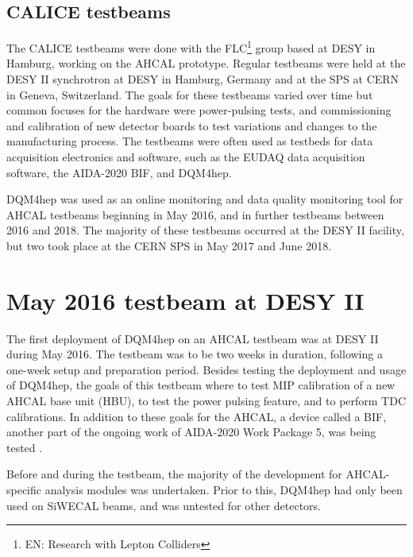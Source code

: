 \subsection*{CALICE testbeams}
The \acrshort{CALICE} testbeams were done with the \acrfull{FLC}\footnote{EN: Research with Lepton Colliders} group based at \acrshort{DESY} in Hamburg, working on the \acrshort{AHCAL} prototype. Regular testbeams were held at the DESY II synchrotron at \acrshort{DESY} in Hamburg, Germany and at the \acrfull{SPS} at \acrshort{CERN} in Geneva, Switzerland. The goals for these testbeams varied over time but common focuses for the hardware were power-pulsing tests, and commissioning and calibration of new detector boards to test variations and changes to the manufacturing process. The testbeams were often used as testbeds for data acquisition electronics and software, such as the \acrshort{EUDAQ} data acquisition software, the AIDA-2020 \acrfull{BIF}, and \acrshort{DQM4hep}.

\acrshort{DQM4hep} was used as an online monitoring and data quality monitoring tool for \acrshort{AHCAL} testbeams beginning in May 2016, and in further testbeams between 2016 and 2018. The majority of these testbeams occurred at the DESY II facility, but two took place at the \acrshort{CERN} \acrshort{SPS} in May 2017 and June 2018.

\section{May 2016 testbeam at DESY II} %
The first deployment of \acrshort{DQM4hep} on an \acrshort{AHCAL} testbeam was at DESY II during May 2016. The testbeam was to be two weeks in duration, following a one-week setup and preparation period. Besides testing the deployment and usage of DQM4hep, the goals of this testbeam where to test \acrshort{MIP} calibration of a new \acrshort{AHCAL} base unit (HBU), to test the power pulsing feature, and to perform \acrshort{TDC} calibrations. In addition to these goals for the \acrshort{AHCAL}, a device called a \acrfull{BIF}, another part of the ongoing work of AIDA-2020 Work Package 5, was being tested  . 

Before and during the testbeam, the majority of the development for AHCAL-specific analysis modules was undertaken. Prior to this, \acrshort{DQM4hep} had only been used on \acrshort{SiWECAL} beams, and was untested for other detectors. 


